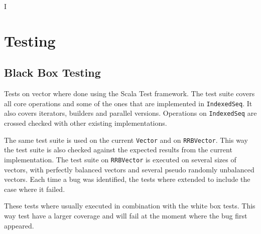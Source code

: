 I%

\chapter{Testing} %

\label{Testing} %



\section{Black Box Testing}
Tests on vector where done using the Scala Test framework. The test suite covers all core operations and some of the ones that are implemented in \texttt{IndexedSeq}. It also covers iterators, builders and parallel versions. Operations on \texttt{IndexedSeq} are crossed checked with other existing implementations.

The same test suite is used on the current \texttt{Vector} and on \texttt{RRBVector}. This way the test suite is also checked against the expected results from the current implementation. The test suite on \texttt{RRBVector} is executed on several sizes of vectors, with perfectly balanced vectors and several pseudo randomly unbalanced vectors. Each time a bug was identified, the tests where extended to include the case where it failed.

These tests where usually executed in combination with the white box tests. This way test have a larger coverage and will fail at the moment where the bug first appeared. 

